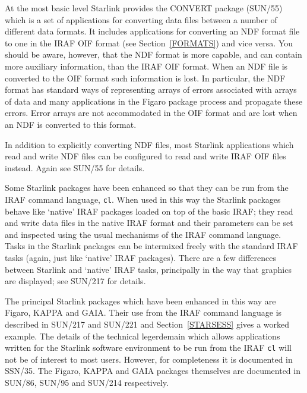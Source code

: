 \documentclass[twoside,11pt]{article}
\newcommand{\xref}[3]{#1}
\begin{document}
At the most basic level Starlink provides the CONVERT package
(\xref{SUN/55}{sun55}{}\cite{SUN55}) which is a set of applications
for converting data files between a number of different data formats.
It includes applications for converting an NDF format file to one in
the IRAF OIF format (see Section~\ref{FORMATS}) and vice versa.  You
should be aware, however, that the NDF format is more capable, and can
contain more auxiliary information, than the IRAF OIF format.  When
an NDF file is converted to the OIF format such information is lost.
In particular, the NDF format has standard ways of representing arrays
of errors associated with arrays of data and many applications in the
Figaro package process and propagate these errors.  Error arrays are
not accommodated in the OIF format and are lost when an NDF is converted
to this format.

In addition to explicitly converting NDF files, most Starlink
applications which read and write NDF files can be configured to
read and write IRAF OIF files instead.  Again see
\xref{SUN/55}{sun55}{}\cite{SUN55} for details.

Some Starlink packages have been enhanced so that they can be run from
the IRAF command language, {\tt cl}.  When used in this way the Starlink
packages behave like `native' IRAF packages loaded on top of the basic
IRAF; they read and write data files in the native IRAF format and their
parameters can be set and inspected using the usual mechanisms of the
IRAF command language.  Tasks in the Starlink packages can be intermixed
freely with the standard IRAF tasks (again, just like `native' IRAF
packages).  There are a few differences between Starlink and `native'
IRAF tasks, principally in the way that graphics are displayed; see
\xref{SUN/217}{sun217}{}\cite{SUN217} for details.

The principal Starlink packages which have been enhanced in this way
are Figaro, KAPPA and GAIA.  Their use from the IRAF command language is
described in \xref{SUN/217}{sun217}{}\cite{SUN217} and
\xref{SUN/221}{sun221}{}\cite{SUN221} and Section~\ref{STARSESS} gives
a worked example.  The details of the technical legerdemain which
allows applications written for the Starlink software environment to
be run from the IRAF {\tt cl} will not be of interest to most users.
However, for completeness it is documented in
\xref{SSN/35}{ssn35}{}\cite{SSN35}.  The Figaro, KAPPA and GAIA packages
themselves are documented in \xref{SUN/86}{sun86}{}\cite{SUN86},
\xref{SUN/95}{sun95}{}\cite{SUN95} and \xref{SUN/214}{sun214}{}\cite{SUN214}
respectively.
\end{document}
